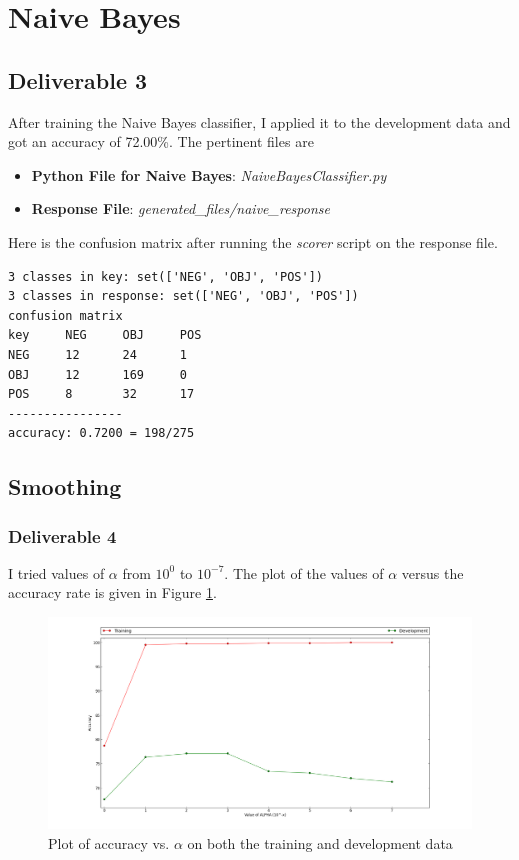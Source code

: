 \documentclass[10pt, letter]{article}
\begin{document}
\section{Naive Bayes}
\subsection*{Deliverable 3}
After training the Naive Bayes classifier, I applied it to the development data and got an accuracy of 72.00\%. The pertinent files are
\begin{itemize}
	\item \textbf{Python File for Naive Bayes}: \textit{NaiveBayesClassifier.py}
	\item \textbf{Response File}: \textit{generated\_files/naive\_response}
\end{itemize}
Here is the confusion matrix after running the \textit{scorer} script on the response file.
\begin{verbatim}
3 classes in key: set(['NEG', 'OBJ', 'POS'])
3 classes in response: set(['NEG', 'OBJ', 'POS'])
confusion matrix
key     NEG     OBJ     POS
NEG     12      24      1
OBJ     12      169     0
POS     8       32      17
----------------
accuracy: 0.7200 = 198/275
\end{verbatim}

\subsection{Smoothing}
\subsubsection*{Deliverable 4}
I tried values of $\alpha$ from $10^0$ to $10^{-7}$. The plot of the values of $\alpha$ versus the accuracy rate is given in Figure \ref{del4}. 
\begin{figure}[H]
  \centering
    \includegraphics[scale=0.25]{images/deliverable_4}
    \caption{Plot of accuracy vs. $\alpha$ on both the training and development data}
  \label{del4}
\end{figure}
\end{document}
